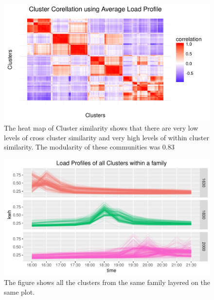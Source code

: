 \begin{figure}[ht]
    \centering
    \includegraphics[width=\textwidth]{Figures/Results/ClusterCorLoadLarge.png}
    \caption[Cluster similarity heatmap]{The heat map of Cluster similarity shows that there are very low levels of cross cluster similarity and very high levels of within cluster similarity. The modularity of these communities was 0.83}
    \label{fig:corheat}
\end{figure}

\begin{figure}
    \centering
    \includegraphics[width=\textwidth]{Figures/Results/ClusterFamilySample}
    \caption[Within Cluster Family Node Profile]{The figure shows all the clusters from the same family layered on the same plot.}
    \label{fig:ClusterFamilySample}
\end{figure}


